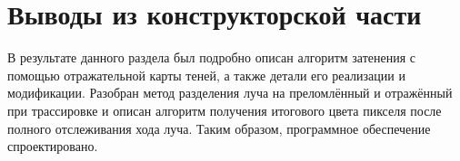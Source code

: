 \section*{Выводы из конструкторской части}
В результате данного раздела был подробно описан алгоритм затенения с помощью
отражательной карты теней, а также детали его реализации и модификации.
Разобран метод разделения луча на преломлённый и отражённый
при трассировке и описан алгоритм получения итогового цвета пикселя
после полного отслеживания хода луча.
Таким образом, программное обеспечение спроектировано.